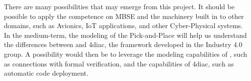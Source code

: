 There are many possibilities that may emerge from this project. It should be
possible to apply the competence on MBSE and the machinery built in \autofocus
to other domains, such as Avionics, IoT applications, and other Cyber-Physical
systems. In the medium-term, the modeling of the Pick-and-Place will help us
understand the differences between \autofocus and 4diac, the framework
developed in the Industry 4.0 group. A possibility would then be to leverage the
modeling capabilities of \autofocus, such as connections with formal verification, and
the capabilities of 4diac, such as automatic code deployment.


 


